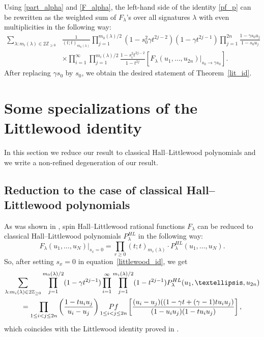 \documentclass[11pt]{article}
\theoremstyle{definition}
\newcommand{\pf}{\mathop{\rm Pf}}
\begin{document}
Using \eqref{part_alpha} and \eqref{F_alpha}, the left-hand side of the identity \eqref{pf_p} can be rewritten as the weighted sum of $F_{\lambda}$'s over all signatures $\lambda$ with even multiplicities in the following way:
\begin{equation*}
\begin{split}
\sum_{\lambda: m_{i}(\lambda) \in 2 \mathbb{Z}_{\geq 0}} &\frac{1}{( t; t)_{m_{0}(\lambda)}} \prod_{j = 1}^{m_{0}(\lambda) / 2} (1 - s_{0}^2 \gamma t^{2j - 2})(1 - \gamma t^{2j-1}) \prod_{j=1}^{2n} \frac{1 - \gamma s_0 u_j}{1 - s_0 u_j}
\\
&\times \prod_{i = 1}^{\infty} \prod_{j = 1}^{m_{i}(\lambda) / 2} \frac{1 - s_{i}^2 t^{2j - 2}}{1 - t^{2j}} \left[F_{\lambda} (u_1, \dots, u_{2n})\Big\vert_{\text{$s_0\to \gamma s_0$}}\right].
\end{split}
\end{equation*}
After replacing $\gamma s_0$ by $s_0$, we obtain the desired statement of Theorem~\ref{lit_id}.

\section{Some specializations of the Littlewood identity} \label{sec: spec}

In this section we reduce our result
to classical Hall--Littlewood polynomials and we write a non-refined degeneration of our result.
\subsection{Reduction to the case of classical Hall--Littlewood polynomials}
As was shown in \cite{Pet21}, spin Hall--Littlewood rational functions $F_{\lambda}$ can be reduced to classical Hall--Littlewood polynomials $P_\lambda^{HL}$ in the following way:
\begin{equation}
F_{\lambda}(u_1, \dots, u_N)\Big\vert_{\text{$s_x=0$}} = \prod_{r\ge0}(t;t)_{m_r(\lambda)}\cdot
P_\lambda^{HL}(u_1,\ldots,u_N).
\end{equation}
So, after setting $ s_x = 0$ in equation~\eqref{littlewood_id}, we get
\begin{multline} \label{class_id}
\sum_{\lambda: m_{i}(\lambda) \in 2 \mathbb{Z}_{\geq 0}}  \prod_{j = 1}^{m_{0}(\lambda) / 2}(1 - \gamma t^{2j-1})\prod_{i = 1}^{\infty} \prod_{j = 1}^{m_{i}(\lambda) / 2} (1 - t^{2j-1}) P_{\lambda}^{HL} (u_1,\ldots,u_{2n})
\\
=
\prod_{1 \leq i<j \leq 2n}
\left(
\frac{1-t u_i u_j}{u_i - u_j}
\right) 
\pf_{1\leq i < j \leq 2n}
\left[
\frac{ (u_i - u_j)((1 - \gamma t+ (\gamma-1)tu_i u_j)}
{(1-u_i u_j) (1-t u_i u_j)}
\right],
\end{multline}
which coincides with the Littlewood identity proved in \cite[Theorem 5]{WZJ16}.
\end{document}
